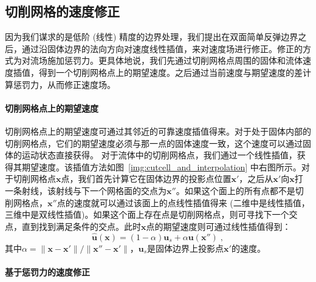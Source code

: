 \subsection{切削网格的速度修正}
因为我们谋求的是低阶 (线性) 精度的边界处理，我们提出在双面简单反弹边界之后，通过沿固体边界的法向方向对速度线性插值，来对速度场进行修正。修正的方式为对流场施加惩罚力。更具体地说，我们先通过切削网格点周围的固体和流体速度插值，得到一个切削网格点上的期望速度。之后通过当前速度与期望速度的差计算惩罚力，从而修正速度场。

\paragraph{切削网格点上的期望速度}
切削网格点上的期望速度可通过其邻近的可靠速度插值得来。对于处于固体内部的切削网格点，它们的期望速度必须与那一点的固体速度一致，这个速度可以通过固体的运动状态直接获得。
对于流体中的切削网格点，我们通过一个线性插值，获得其期望速度。该插值方法如图~\ref{img:cutcell_and_interpolation} 中右图所示。对于切削网格点$\bm{x}$点，我们首先计算它在固体边界的投影点位置$\bm{x}'$，之后从$\bm{x}'$向$\bm{x}$打一条射线，该射线与下一个网格面的交点为$\bm{x}''$。如果这个面上的所有点都不是切削网格点，$\bm{x}''$点的速度就可以通过该面上的点线性插值得来 (二维中是线性插值，三维中是双线性插值)。如果这个面上存在点是切削网格点，则可寻找下一个交点，直到找到满足条件的交点。此时$\bm{x}$点的期望速度则可通过线性插值得到：
\begin{equation}  \label{eq:vel_lerp}
\hat{\bm{u}}(\bm{x})=(1-\alpha)\bm{u}_s + \alpha \bm{u}(\bm{x}'')\;,
\end{equation}
其中$\alpha=\|\bm{x}-\bm{x}'\|/\|\bm{x}''-\bm{x}'\|$，$\bm{u}_s$是固体边界上投影点$\bm{x}'$的速度。

\paragraph{基于惩罚力的速度修正}

